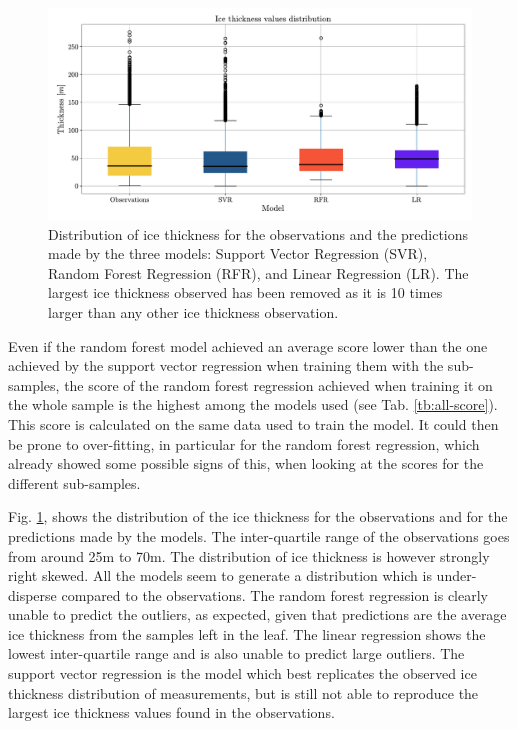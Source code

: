 \begin{figure}[!tp]
	\centering		  
	\includegraphics[width=1.\textwidth]{figures/thick_box.pdf}
	\caption{Distribution of ice thickness for the observations and the predictions made by the three models: Support Vector Regression (SVR), Random Forest Regression (RFR), and Linear Regression (LR). The largest ice thickness observed has been removed as it is 10 times larger than any other ice thickness observation.}
	\label{fig:thick-distr}
\end{figure}

Even if the random forest model achieved an average score lower than the one achieved by the support vector regression when training them with the sub-samples, the score of the random forest regression achieved when training it on the whole sample is the highest among the models used (see Tab. \ref{tb:all-score}). This score is calculated on the same data used to train the model. It could then be prone to over-fitting, in particular for the random forest regression, which already showed some possible signs of this, when looking at the scores for the different sub-samples.

Fig. \ref{fig:thick-distr}, shows the distribution of the ice thickness for the observations and for the predictions made by the models. The inter-quartile range of the observations goes from around 25m to 70m. The distribution of ice thickness is however strongly right skewed. All the models seem to generate a distribution which is under-disperse compared  to the observations. The random forest regression is clearly unable to predict the outliers, as expected, given that predictions are the average ice thickness from the samples left in the leaf. The linear regression shows the lowest inter-quartile range and is also unable to predict large outliers. The support vector regression is the model which best replicates the observed ice thickness distribution of measurements, but is still not able to reproduce the largest ice thickness values found in the observations.

